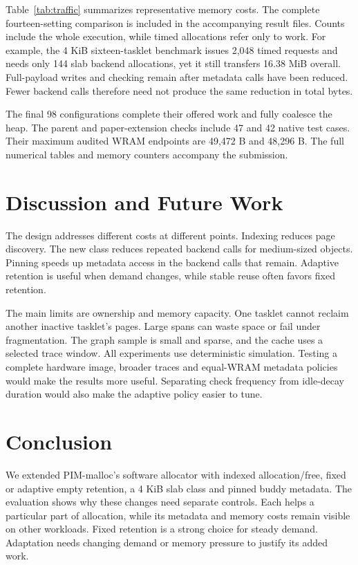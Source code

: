 \documentclass[conference]{IEEEtran}
\begin{document}
Table~\ref{tab:traffic} summarizes representative memory costs. The complete fourteen-setting comparison is included in the accompanying result files. Counts include the whole execution, while timed allocations refer only to work. For example, the 4 KiB sixteen-tasklet benchmark issues 2,048 timed requests and needs only 144 slab backend allocations, yet it still transfers 16.38 MiB overall. Full-payload writes and checking remain after metadata calls have been reduced. Fewer backend calls therefore need not produce the same reduction in total bytes.

The final 98 configurations complete their offered work and fully coalesce the heap. The parent and paper-extension checks include 47 and 42 native test cases. Their maximum audited WRAM endpoints are 49,472 B and 48,296 B. The full numerical tables and memory counters accompany the submission.

\section{Discussion and Future Work}
The design addresses different costs at different points. Indexing reduces page discovery. The new class reduces repeated backend calls for medium-sized objects. Pinning speeds up metadata access in the backend calls that remain. Adaptive retention is useful when demand changes, while stable reuse often favors fixed retention.

The main limits are ownership and memory capacity. One tasklet cannot reclaim another inactive tasklet's pages. Large spans can waste space or fail under fragmentation. The graph sample is small and sparse, and the cache uses a selected trace window. All experiments use deterministic simulation. Testing a complete hardware image, broader traces and equal-WRAM metadata policies would make the results more useful. Separating check frequency from idle-decay duration would also make the adaptive policy easier to tune.

\makeatletter
\if@firstcolumn\newpage\fi
\makeatother

\section{Conclusion}
We extended PIM-malloc's software allocator with indexed allocation/free, fixed or adaptive empty retention, a 4 KiB slab class and pinned buddy metadata. The evaluation shows why these changes need separate controls. Each helps a particular part of allocation, while its metadata and memory costs remain visible on other workloads. Fixed retention is a strong choice for steady demand. Adaptation needs changing demand or memory pressure to justify its added work.
\end{document}
